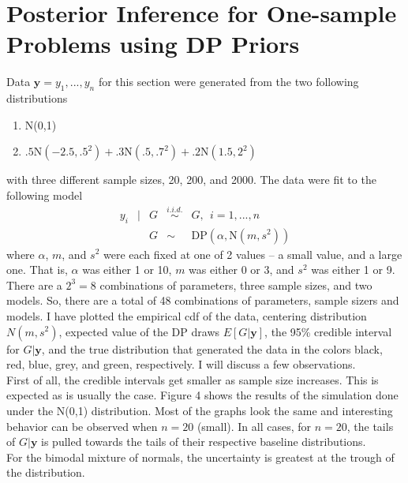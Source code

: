 \documentclass{article}
\begin{document}
\newpage
\section{Posterior Inference for One-sample Problems using DP Priors}
Data $\mathbf y = y_1,...,y_n$ for this section were generated from 
the two following distributions
\begin{enumerate}
  \item N(0,1) \\
  \item $.5$N$(−2.5, .5^2 ) + .3$N$(.5, .7^2 ) + .2$N$(1.5, 2^2 )$\\
\end{enumerate}
with three different sample sizes, 20, 200, and 2000. The data were fit 
to the following model
\[
  \begin{array}{rclcl}
    y_i &|& G &\overset{i.i.d.}{\sim}& G,~~ i = 1, ..., n \\
        &&  G &\sim& \text{DP}(\alpha, \text{N}(m,s^2) )
  \end{array}
\]
where $\alpha$, $m$, and $s^2$ were each fixed at one of 2 values -- a small
value, and a large one. That is, $\alpha$ was either 1 or 10, $m$ was either 0
or 3, and $s^2$ was either 1 or 9. There are a $2^3=8$ combinations of
parameters, three sample sizes, and two models. So, there are a total of 48
combinations of parameters, sample sizers and models. I have plotted the
empirical cdf of the data, centering distribution $N(m,s^2)$, expected value of
the DP draws $E[G|\mathbf y]$, the 95\% credible interval for $G|\mathbf y$,
and the true distribution that generated the data in the colors black, red,
blue, grey, and green, respectively. I will discuss a few observations. \\

\noindent
First of all, the credible intervals get smaller as sample size increases. This
is expected as is usually the case. Figure 4 shows the results of the simulation 
done under the N(0,1) distribution. Most of the graphs look the same and 
interesting behavior can be observed when $n=20$ (small). In all cases, for 
$n=20$, the tails of $G|\mathbf y$ is pulled towards the tails of their respective
baseline distributions. \\

\noindent
For the bimodal mixture of normals, the uncertainty is greatest at the trough 
of the distribution.\\
\end{document}
